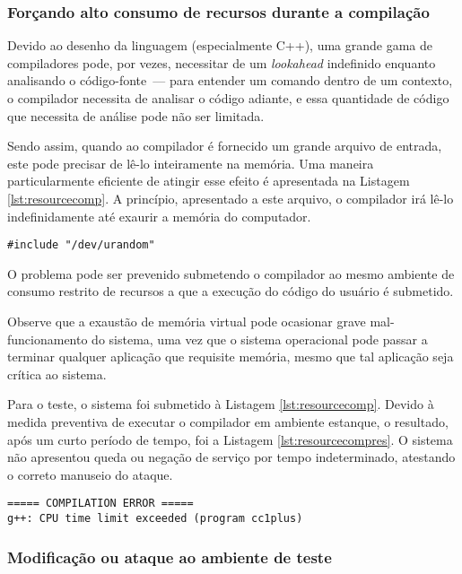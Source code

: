 \documentclass[ruledheader, 12pt]{abnt}
\begin{document}
\subsubsection{Forçando alto consumo de recursos durante a compilação}

Devido ao desenho da linguagem (especialmente C++), uma grande gama de compiladores pode, por vezes, necessitar de um \emph{lookahead} indefinido enquanto analisando o código-fonte~--- para entender um comando dentro de um contexto, o compilador necessita de analisar o código adiante, e essa quantidade de código que necessita de análise pode não ser limitada.

Sendo assim, quando ao compilador é fornecido um grande arquivo de entrada, este pode precisar de lê-lo inteiramente na memória. Uma maneira particularmente eficiente de atingir esse efeito é apresentada na Listagem \ref{lst:resourcecomp}. A princípio, apresentado a este arquivo, o compilador irá lê-lo indefinidamente até exaurir a memória do computador.

\begin{lstlisting}[float=bp, label=lst:resourcecomp, caption=Código C++ com alto consumo de recursos durante a compilação]
#include "/dev/urandom"
\end{lstlisting}

O problema pode ser prevenido submetendo o compilador ao mesmo ambiente de consumo restrito de recursos a que a execução do código do usuário é submetido.

Observe que a exaustão de memória virtual pode ocasionar grave mal-funcionamento do sistema, uma vez que o sistema operacional pode passar a terminar qualquer aplicação que requisite memória, mesmo que tal aplicação seja crítica ao sistema.

Para o teste, o sistema foi submetido à Listagem \ref{lst:resourcecomp}. Devido à medida preventiva de executar o compilador em ambiente estanque, o resultado, após um curto período de tempo, foi a Listagem \ref{lst:resourcecompres}. O sistema não apresentou queda ou negação de serviço por tempo indeterminado, atestando o correto manuseio do ataque.

\begin{lstlisting}[float=bp, label=lst:resourcecompres, caption=Erro proveniente de alto consumo de recursos durante compilação]
===== COMPILATION ERROR =====
g++: CPU time limit exceeded (program cc1plus)
\end{lstlisting}

\subsubsection{Modificação ou ataque ao ambiente de teste}
\end{document}
